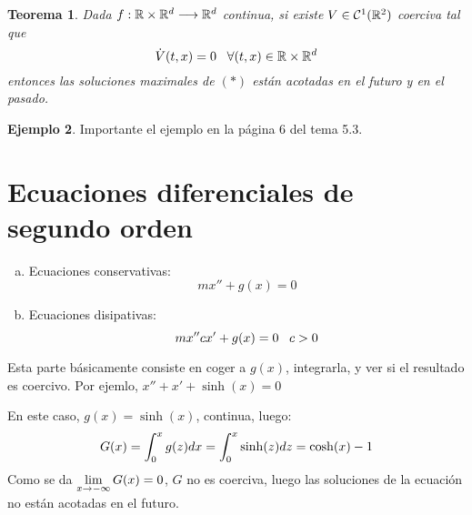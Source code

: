 \documentclass[12pt]{article}
\newtheorem{theorem}{Teorema}
\theoremstyle{definition}
\newtheorem{example}[theorem]{Ejemplo}
\theoremstyle{remark}
\begin{document}
\begin{theorem}
Dada $f : \mathbb{R}\times\mathbb{R}^d \longrightarrow \mathbb{R}^d$ continua, si existe $V\in\mathcal{C}^1(\mathbb{R}^2)$ coerciva tal que
\[
\dot{V}(t,x)=0 \;\;\; \forall (t,x)\in\mathbb{R}\times\mathbb{R}^d
\]
entonces las soluciones maximales de $(*)$ están acotadas en el futuro y en el pasado.
\end{theorem}
\begin{example}
Importante el ejemplo en la página 6 del tema 5.3.
\end{example}

\section{Ecuaciones diferenciales de segundo orden}

\begin{enumerate}[(a)]
\item Ecuaciones conservativas:
\[
mx''+g(x)=0
\]
\item Ecuaciones disipativas:
\[
mx''cx'+g(x)=0 \;\;\; c>0
\]
\end{enumerate}

Esta parte básicamente consiste en coger a $g(x)$, integrarla, y ver si el resultado es coercivo. Por ejemlo, $x''+x'+\sinh(x)=0$

En este caso, $g(x)=\sinh(x)$, continua, luego:
\[
G(x)=\displaystyle\int_{ 0 }^{ x } g(z)dx=\displaystyle\int_{ 0 }^{ x } \sinh(z)dz=\cosh(x)-1
\]
Como se da $\displaystyle\lim_{ x \to -\infty } G(x)=0$, $G$ no es coerciva, luego las soluciones de la ecuación no están acotadas en el futuro.
\end{document}
